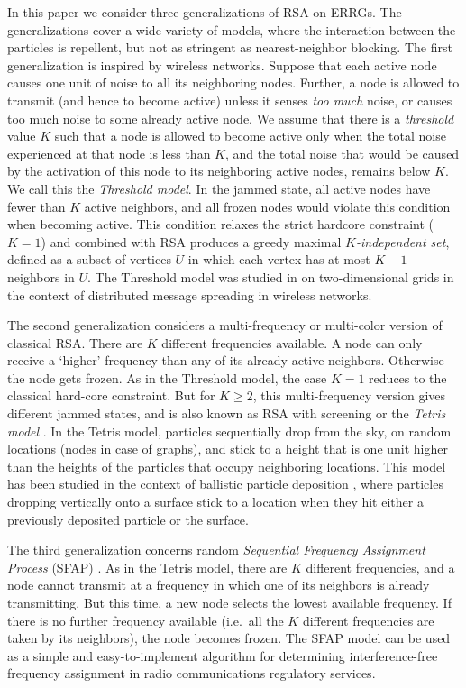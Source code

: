 \documentclass[11pt,a4paper, reqno]{article}
\begin{document}
In this paper we consider three generalizations of RSA on ERRGs.
The generalizations cover a wide variety of models, where the interaction between the particles is repellent, but not as stringent as nearest-neighbor blocking.
The first generalization is inspired by wireless networks.
Suppose that each active node causes one unit of noise to all its neighboring nodes. Further, a node is allowed to transmit (and hence to become active) unless it senses \emph{too much} noise, or causes too much noise to some already active node.
We assume that there is a \emph{threshold} value $K$ such that a node is allowed to become active only when the total noise experienced at that node is less than $K$, and the total noise that would be caused by the activation of this node to its neighboring active nodes, remains below $K$. We call this the \emph{Threshold model}. 
In the jammed state, all active  nodes  have fewer than $K$ active neighbors, and all frozen nodes would violate this condition when becoming active. 
This condition relaxes the strict hardcore constraint ($K=1$) and combined with RSA produces a greedy maximal \emph{$K$-independent set}, defined as a subset of vertices $U$ in which each vertex has at most $K-1$ neighbors in $U$. 
The Threshold model was studied in \cite{M14, MBBD15} on two-dimensional grids in the context of distributed message spreading in wireless networks.

The second generalization considers a multi-frequency or multi-color version of classical RSA. There are $K$ different frequencies available.
A node can only receive a `higher' frequency than any of its already active neighbors.
Otherwise the node gets frozen. As in the Threshold model, the case $K=1$ reduces to the classical hard-core constraint. 
But for $K\geq 2$, this multi-frequency version gives different jammed states, and is also known as RSA with screening or the \emph{Tetris model} \cite{FK10}. 
In the Tetris model, particles sequentially drop from the sky, on random locations (nodes in case of graphs), and stick to a height that is one unit higher than the heights of the particles that occupy neighboring locations.
This model has been studied in the context of ballistic particle deposition \cite{M83}, where particles dropping vertically onto  a surface stick to a location when they hit either a previously deposited particle or the surface.

The third generalization concerns random \emph{Sequential Frequency Assignment Process} (SFAP) \cite{FD07,FK09}. As in the Tetris model, there are $K$ different frequencies, and a node cannot transmit at a frequency in which one of its neighbors is already transmitting.
But this time, a new node selects the lowest available frequency. If there is no further frequency available  (i.e.~all the $K$ different frequencies are taken by its neighbors), the node becomes frozen.  The SFAP model can be used as a simple and easy-to-implement algorithm for determining  interference-free frequency assignment \cite{FD07} in  radio communications  regulatory  services.
\end{document}
